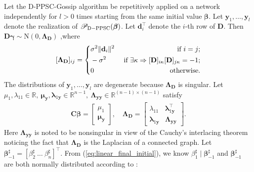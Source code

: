\documentclass[a4paper, 11pt]{article}
\newcommand{\R}{\mathbb{R}}
\newcommand{\1}{\mathbf{1}}
\newcommand{\PFS}{\mathpzc{P}}
\newcommand{\yb}{\mathbf{y}}
\newcommand{\Cb}{\mathbf{C}}
\newcommand{\Db}{\mathbf{D}}
\newcommand{\db}{\mathbf{d}}
\newcommand{\cb}{\mathbf{c}}
\newcommand{\normdist}{\mathrm{N}}
\newcommand{\gammab}{{\bm \gamma}}
\newcommand{\lambdab}{{\bm \lambda}}
\newcommand{\betab}{\bm{\beta}}
\newcommand{\mub}{\bm{\mu}}
\newcommand{\Lambdab}{\bm{\Lambda}}
\begin{document}
{	
	Let the D-PPSC-Gossip algorithm be repetitively applied on a network independently for $l>0$ times starting from the same initial value $\betab$. Let $\yb_1,\dots,\yb_l$ denote the realization of $\mathscr{P}_{\rm D-PPSC}(\betab)$.
	Let $\db_i^\top$ denote the $i$-th row of $\Db$. Then $\Db\gammab\sim\normdist(0,\Lambdab_{\Db})$ ,where
	\begin{equation}\notag
	[\Lambdab_{\Db}]_{ij}=\left\{
	\begin{aligned}
	& \sigma^2\|\db_i\|^2 & \textnormal{ if }i=j;\\
	& -\sigma^2 & \textnormal{ if }\exists \kappa\Rightarrow[\Db]_{i\kappa}[\Db]_{j\kappa}=-1;\\
	& 0 & \textnormal{ otherwise}.
	\end{aligned}
	\right.
	\end{equation}
	The distributions of $\yb_1,\dots,\yb_l$ are degenerate because $\Lambdab_{\Db}$ is singular.
	Let $\mu_1,\lambda_{11}\in\R,\ \mub_{\yb},\lambdab_{1\yb}\in\R^{n-1},\ \Lambdab_{\yb\yb}\in\R^{(n-1)\times (n-1)}$ satisfy
	\begin{equation}\label{eq:decomp1}
	\begin{aligned}
	\Cb\betab=
	\begin{bmatrix}
	\mu_1\\
	\mub_{\yb}
	\end{bmatrix}
	,\quad
	\Lambdab_{\Db}=
	\begin{bmatrix}
	\lambda_{11} & \lambdab_{1\yb}^\top\\
	\lambdab_{1\yb} & \Lambdab_{\yb\yb}
	\end{bmatrix}.
	\end{aligned}
	\end{equation}
	Here $\Lambdab_{\yb\yb}$ is noted to be nonsingular in view of the Cauchy's interlacing theorem \cite{horn1990matrix} noticing the fact that $\Lambdab_{\Db}$ is the Laplacian of a connected graph. Let $\betab_{-1}^\sharp=[\beta_2^\sharp\ \dots\ \beta^\sharp_n]^\top$. From (\ref{eq:linear_final_initial}), we know $\beta^\sharp_1\mid\betab^\sharp_{-1}$ and $\betab^\sharp_{-1}$ are both normally distributed according to \cite{rasmussen2004gaussian}:
}
\end{document}
